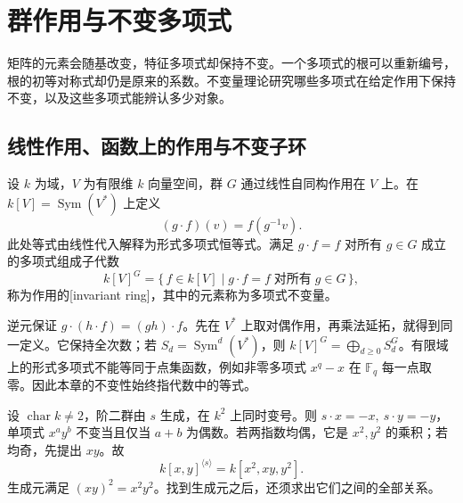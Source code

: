 %
%
\section{群作用与不变多项式}
\label{b5:sec:2201}

矩阵的元素会随基改变，特征多项式却保持不变。一个多项式的根可以重新编号，根的初等对称式却仍是原来的系数。不变量理论研究哪些多项式在给定作用下保持不变，以及这些多项式能辨认多少对象。

\subsection{线性作用、函数上的作用与不变子环}
\label{b5:subsec:2201:01}

\begin{definition}\label{b5:def:invariant-ring-revisited}
	设 \(k\) 为域，\(V\) 为有限维 \(k\) 向量空间，群 \(G\) 通过线性自同构作用在 \(V\) 上。在 \(k[V]=\operatorname{Sym}(V^*)\) 上定义
	\[
		(g\cdot f)(v)=f(g^{-1}v).
	\]
	此处等式由线性代入解释为形式多项式恒等式。满足 \(g\cdot f=f\) 对所有 \(g\in G\) 成立的多项式组成子代数
	\[
		k[V]^G=\bigl\{\,f\in k[V]\mid g\cdot f=f\;\text{对所有}\;g\in G\,\bigr\},
	\]
	称为作用的[invariant ring]，其中的元素称为多项式不变量。
\end{definition}

逆元保证 \(g\cdot(h\cdot f)=(gh)\cdot f\)。先在 \(V^*\) 上取对偶作用，再乘法延拓，就得到同一定义。它保持全次数；若 \(S_d=\operatorname{Sym}^d(V^*)\)，则 \(k[V]^G=\bigoplus_{d\ge0}S_d^G\)。有限域上的形式多项式不能等同于点集函数，例如非零多项式 \(x^q-x\) 在 \(\mathbb F_q\) 每一点取零。因此本章的不变性始终指代数中的等式。

\begin{example}\label{b5:exm:invariant-sign-action}
	设 \(\operatorname{char}k\ne2\)，阶二群由 \(s\) 生成，在 \(k^2\) 上同时变号。则 \(s\cdot x=-x,\ s\cdot y=-y\)，单项式 \(x^ay^b\) 不变当且仅当 \(a+b\) 为偶数。若两指数均偶，它是 \(x^2,y^2\) 的乘积；若均奇，先提出 \(xy\)。故
	\[
		k[x,y]^{\langle s\rangle}=k[x^2,xy,y^2].
	\]
	生成元满足 \((xy)^2=x^2y^2\)。找到生成元之后，还须求出它们之间的全部关系。
\end{example}

